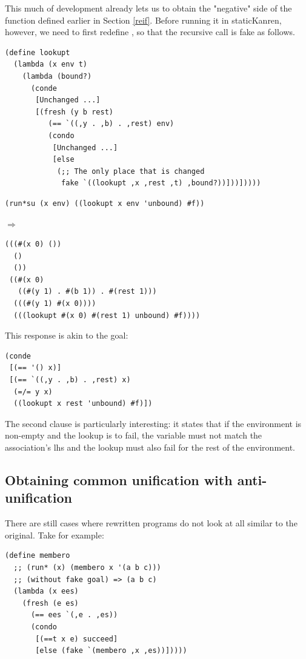 This much of development already lets us to obtain the "negative" side of the  function defined earlier in Section \ref{reif}. Before running it in staticKanren, however, we need to first redefine , so that the recursive call is fake as follows.
\begin{lstlisting}
(define lookupt
  (lambda (x env t)
    (lambda (bound?)
      (conde
       [Unchanged ...]
       [(fresh (y b rest)
          (== `((,y . ,b) . ,rest) env)
          (condo
           [Unchanged ...]
           [else
            (;; The only place that is changed
             fake `((lookupt ,x ,rest ,t) ,bound?))]))]))))
\end{lstlisting}

\begin{lstlisting}
(run*su (x env) ((lookupt x env 'unbound) #f))
\end{lstlisting}
$\Rightarrow$
\begin{lstlisting}
(((#(x 0) ())
  () 
  ())
 ((#(x 0) 
   ((#(y 1) . #(b 1)) . #(rest 1)))
  (((#(y 1) #(x 0))))
  (((lookupt #(x 0) #(rest 1) unbound) #f))))
\end{lstlisting}
This response is akin to the goal:
\begin{lstlisting}
(conde
 [(== '() x)]
 [(== `((,y . ,b) . ,rest) x)
  (=/= y x)
  ((lookupt x rest 'unbound) #f)])
\end{lstlisting}
The second clause is particularly interesting: it states that if the environment is non-empty and the lookup is to fail, the variable  must not match the association's lhs and the lookup must also fail for the rest of the environment.

\subsection{Obtaining common unification with anti-unification}\label{au}
There are still cases where rewritten programs do not look at all similar to the original. Take  for example:
\begin{lstlisting}
(define membero
  ;; (run* (x) (membero x '(a b c)))
  ;; (without fake goal) => (a b c)
  (lambda (x ees)
    (fresh (e es)
      (== ees `(,e . ,es))
      (condo
       [(==t x e) succeed]
       [else (fake `(membero ,x ,es))]))))
\end{lstlisting}

